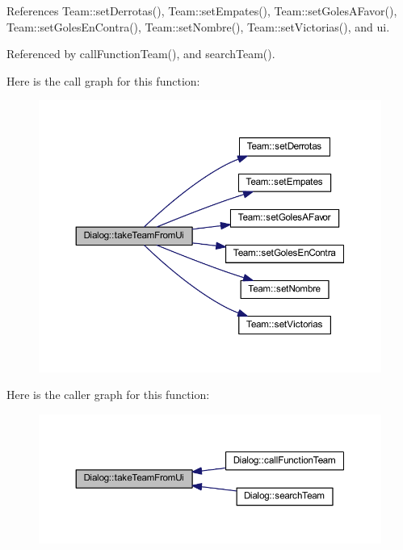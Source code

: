 References Team\+::set\+Derrotas(), Team\+::set\+Empates(), Team\+::set\+Goles\+A\+Favor(), Team\+::set\+Goles\+En\+Contra(), Team\+::set\+Nombre(), Team\+::set\+Victorias(), and ui.



Referenced by call\+Function\+Team(), and search\+Team().



Here is the call graph for this function\+:
\nopagebreak
\begin{figure}[H]
\begin{center}
\leavevmode
\includegraphics[width=350pt]{df/da9/class_dialog_a03a550e5b4fa16614d27f8d4e2329e10_cgraph}
\end{center}
\end{figure}




Here is the caller graph for this function\+:
\nopagebreak
\begin{figure}[H]
\begin{center}
\leavevmode
\includegraphics[width=350pt]{df/da9/class_dialog_a03a550e5b4fa16614d27f8d4e2329e10_icgraph}
\end{center}
\end{figure}




